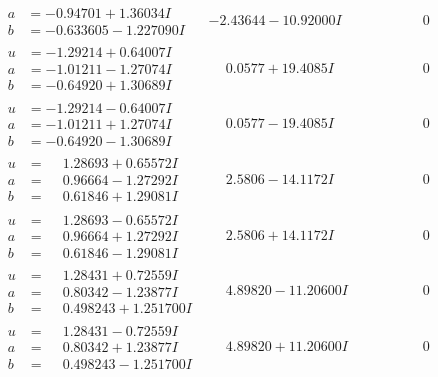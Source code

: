 \documentclass[1p]{elsarticle_modified}
\theoremstyle{definition}
\begin{document}
$$\begin{array}{c|c|c}
\begin{aligned}
a &= -0.94701 + 1.36034 I \\
b &= -0.633605 - 1.227090 I\end{aligned}
 & -2.43644 - 10.92000 I & \phantom{-0.000000 } 0 \\ \hline\begin{aligned}
u &= -1.29214 + 0.64007 I \\
a &= -1.01211 - 1.27074 I \\
b &= -0.64920 + 1.30689 I\end{aligned}
 & \phantom{-}0.0577 + 19.4085 I & \phantom{-0.000000 } 0 \\ \hline\begin{aligned}
u &= -1.29214 - 0.64007 I \\
a &= -1.01211 + 1.27074 I \\
b &= -0.64920 - 1.30689 I\end{aligned}
 & \phantom{-}0.0577 - 19.4085 I & \phantom{-0.000000 } 0 \\ \hline\begin{aligned}
u &= \phantom{-}1.28693 + 0.65572 I \\
a &= \phantom{-}0.96664 - 1.27292 I \\
b &= \phantom{-}0.61846 + 1.29081 I\end{aligned}
 & \phantom{-}2.5806 - 14.1172 I & \phantom{-0.000000 } 0 \\ \hline\begin{aligned}
u &= \phantom{-}1.28693 - 0.65572 I \\
a &= \phantom{-}0.96664 + 1.27292 I \\
b &= \phantom{-}0.61846 - 1.29081 I\end{aligned}
 & \phantom{-}2.5806 + 14.1172 I & \phantom{-0.000000 } 0 \\ \hline\begin{aligned}
u &= \phantom{-}1.28431 + 0.72559 I \\
a &= \phantom{-}0.80342 - 1.23877 I \\
b &= \phantom{-}0.498243 + 1.251700 I\end{aligned}
 & \phantom{-}4.89820 - 11.20600 I & \phantom{-0.000000 } 0 \\ \hline\begin{aligned}
u &= \phantom{-}1.28431 - 0.72559 I \\
a &= \phantom{-}0.80342 + 1.23877 I \\
b &= \phantom{-}0.498243 - 1.251700 I\end{aligned}
 & \phantom{-}4.89820 + 11.20600 I & \phantom{-0.000000 } 0 \\ \hline\begin{aligned}

\end{aligned}
\end{array}$$
\end{document}
